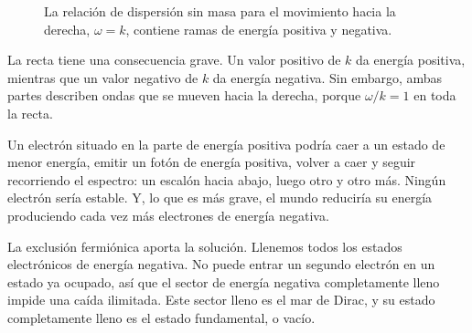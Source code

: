 \begin{figure}[htbp]
\centering
{}
\caption{La relación de dispersión sin masa para el movimiento hacia la derecha, \(\omega=k\), contiene ramas de energía positiva y negativa.}
\end{figure}

La recta tiene una consecuencia grave. Un valor positivo de \(k\) da energía positiva, mientras que un valor negativo de \(k\) da energía negativa. Sin embargo, ambas partes describen ondas que se mueven hacia la derecha, porque \(\omega/k=1\) en toda la recta.

Un electrón situado en la parte de energía positiva podría caer a un estado de menor energía, emitir un fotón de energía positiva, volver a caer y seguir recorriendo el espectro: un escalón hacia abajo, luego otro y otro más. Ningún electrón sería estable. Y, lo que es más grave, el mundo reduciría su energía produciendo cada vez más electrones de energía negativa.

La exclusión fermiónica aporta la solución. Llenemos todos los estados electrónicos de energía negativa. No puede entrar un segundo electrón en un estado ya ocupado, así que el sector de energía negativa completamente lleno impide una caída ilimitada. Este sector lleno es el mar de Dirac, y su estado completamente lleno es el estado fundamental, o vacío.

\begin{classroomqa}
\end{classroomqa}

